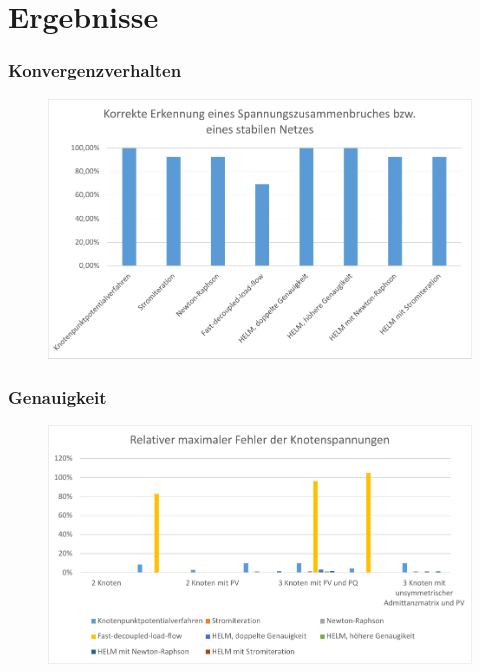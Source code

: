 \documentclass[hyperref={pdfpagelabels=false},compress]{beamer}
\begin{document}
\section{Ergebnisse}
\begin{frame}
	\frametitle{Konvergenzverhalten}	
	\begin{figure}
		\centering
		\includegraphics[scale=0.6]{pictures/convergence}
	\end{figure}
\end{frame}

\begin{frame}
	\frametitle{Genauigkeit}
	\begin{figure}
		\centering
		\includegraphics[scale=0.6]{pictures/precision_1}
	\end{figure}
\end{frame}
\end{document}

